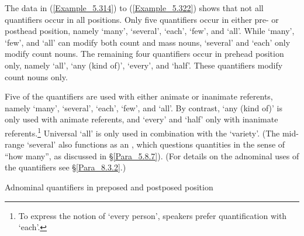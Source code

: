The data in (\ref{Example_5.314}) to (\ref{Example_5.322}) shows that not all quantifiers occur in all positions. Only five quantifiers occur in either pre- or posthead position, namely  ‘many’,  ‘several’,  ‘each’,  ‘few’, and  ‘all’. While  ‘many’,  ‘few’, and  ‘all’ can modify both count and mass nouns,  ‘several’ and  ‘each’ only modify count nouns. The remaining four quantifiers occur in prehead position only, namely  ‘all’,  ‘any (kind of)’,  ‘every’, and  ‘half’. These quantifiers modify count nouns only.



Five of the quantifiers are used with either animate or inanimate referents, namely  ‘many’,  ‘several’,  ‘each’,  ‘few’, and  ‘all’. By contrast,  ‘any (kind of)’ is only used with animate referents, and  ‘every’ and  ‘half’ only with inanimate referents.\footnote{To express the notion of ‘every person’, speakers prefer quantification with  ‘each’.} Universal  ‘all’ is only used in combination with the   ‘variety’. (The mid-range   ‘several’ also functions as an , which questions quantities in the sense of ``how many'', as discussed in §\ref{Para_5.8.7}). (For details on the adnominal uses of the quantifiers see §\ref{Para_8.3.2}.)
 
 


\begin{styleExampleTitle}
Adnominal quantifiers in preposed and postposed position
\end{styleExampleTitle}

